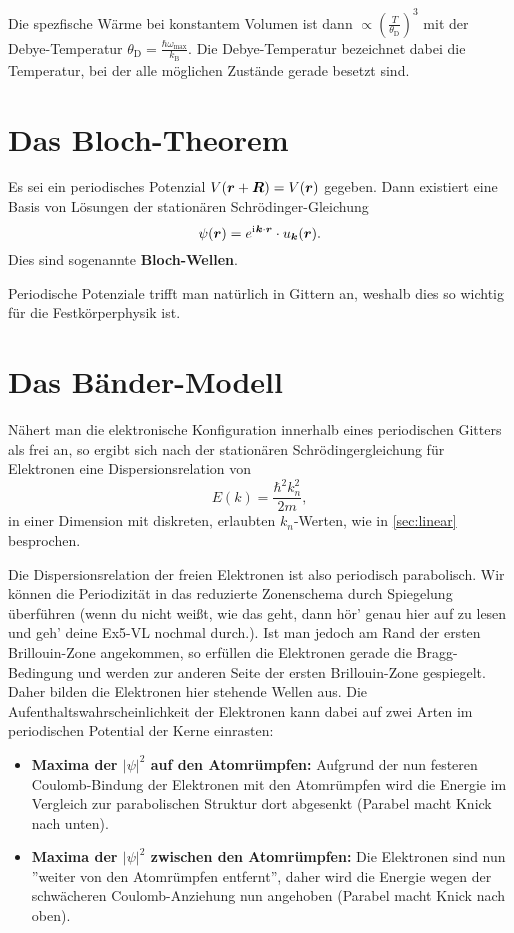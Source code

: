 Die spezfische Wärme bei konstantem Volumen ist dann $\propto \left(\frac{T}{\theta_\text{D}}\right)^3$ mit der Debye-Temperatur $\theta_\text{D}=\frac{\hbar\omega_\text{max}}{k_\text{B}}$.
Die Debye-Temperatur bezeichnet dabei die Temperatur, bei der alle möglichen Zustände gerade besetzt sind.

\section{Das Bloch-Theorem}
Es sei ein periodisches Potenzial $V(\boldsymbol{r}+\boldsymbol{R}) = V(\boldsymbol{r})$ gegeben.
Dann existiert eine Basis von Lösungen der stationären Schrödinger-Gleichung
\begin{equation*}
	\psi(\boldsymbol{r}) = e^{\mathrm{i}\mkern1mu\boldsymbol{k}\cdot\boldsymbol{r}}\cdot u_{\boldsymbol{k}}(\boldsymbol{r}).
\end{equation*}
Dies sind sogenannte \textbf{Bloch-Wellen}.

Periodische Potenziale trifft man natürlich in Gittern an, weshalb dies so wichtig für die Festkörperphysik ist.

\section{Das Bänder-Modell}
Nähert man die elektronische Konfiguration innerhalb eines periodischen Gitters als frei an, so ergibt sich nach der stationären Schrödingergleichung für Elektronen eine Dispersionsrelation von
\begin{equation*}
	E(k) = \frac{\hbar^2 k_n^2}{2m},
\end{equation*}
in einer Dimension mit diskreten, erlaubten $k_n$-Werten, wie in \autoref{sec:linear} besprochen.

Die Dispersionsrelation der freien Elektronen ist also periodisch parabolisch.
Wir können die Periodizität in das reduzierte Zonenschema durch Spiegelung überführen (wenn du nicht weißt, wie das geht, dann hör' genau hier auf zu lesen und geh' deine Ex5-VL nochmal durch.).
Ist man jedoch am Rand der ersten Brillouin-Zone angekommen, so erfüllen die Elektronen gerade die Bragg-Bedingung und werden zur anderen Seite der ersten Brillouin-Zone gespiegelt.
Daher bilden die Elektronen hier stehende Wellen aus.
Die Aufenthaltswahrscheinlichkeit der Elektronen kann dabei auf zwei Arten im periodischen Potential der Kerne einrasten:
\begin{itemize}
	\item \textbf{Maxima der $|\psi|^2$ auf den Atomrümpfen:} Aufgrund der nun festeren Coulomb-Bindung der Elektronen mit den Atomrümpfen wird die Energie im Vergleich zur parabolischen Struktur dort abgesenkt (Parabel macht Knick nach unten).
	\item \textbf{Maxima der $|\psi|^2$ zwischen den Atomrümpfen:} Die Elektronen sind nun ''weiter von den Atomrümpfen entfernt'', daher wird die Energie wegen der schwächeren Coulomb-Anziehung nun angehoben (Parabel macht Knick nach oben).
\end{itemize}

